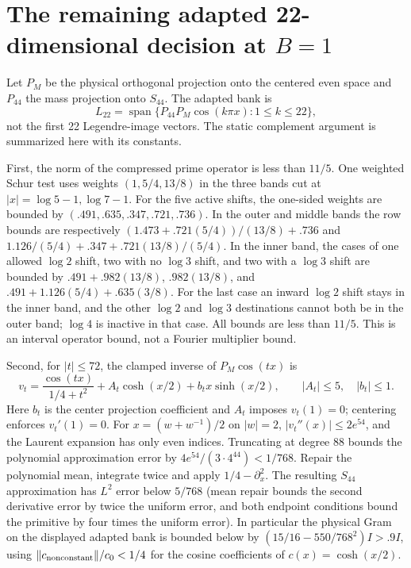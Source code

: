 \documentclass[11pt,a4paper]{article}
\numberwithin{equation}{section}
\theoremstyle{definition}\newtheorem{definition}[theorem]{Definition}
\theoremstyle{remark}\newtheorem{remark}[theorem]{Remark}
\begin{document}
\section[Adapted 22-dimensional decision at B=1]{The remaining adapted 22-dimensional decision at $B=1$}
Let $P_M$ be the physical orthogonal projection onto the centered even space and $P_{44}$ the mass projection onto $S_{44}$. The adapted bank is
\[
 L_{22}=\operatorname{span}\{P_{44}P_M\cos(k\pi x):1\le k\le22\},
\]
not the first 22 Legendre-image vectors. The static complement argument is summarized here with its constants.

First, the norm of the compressed prime operator is less than $11/5$. One weighted Schur test uses weights $(1,5/4,13/8)$ in the three bands cut at $|x|=\log5-1,\log7-1$. For the five active shifts, the one-sided weights are bounded by $(.491,.635,.347,.721,.736)$. In the outer and middle bands the row bounds are respectively $(1.473+.721(5/4))/(13/8)+.736$ and $1.126/(5/4)+.347+.721(13/8)/(5/4)$. In the inner band, the cases of one allowed $\log 2$ shift, two with no $\log3$ shift, and two with a $\log3$ shift are bounded by $.491+.982(13/8)$, $.982(13/8)$, and $.491+1.126(5/4)+.635(3/8)$. For the last case an inward $\log2$ shift stays in the inner band, and the other $\log2$ and $\log3$ destinations cannot both be in the outer band; $\log4$ is inactive in that case. All bounds are less than $11/5$. This is an interval operator bound, not a Fourier multiplier bound.

Second, for $|t|\le72$, the clamped inverse of $P_M\cos(tx)$ is
\[
 v_t=\frac{\cos(tx)}{1/4+t^2}+A_t\cosh(x/2)+b_t x\sinh(x/2),
 \qquad |A_t|\le5,\quad |b_t|\le1.
\]
Here $b_t$ is the center projection coefficient and $A_t$ imposes $v_t(1)=0$; centering enforces $v_t'(1)=0$. For $x=(w+w^{-1})/2$ on $|w|=2$, $|v_t''(x)|\le2e^{54}$, and the Laurent expansion has only even indices. Truncating at degree 88 bounds the polynomial approximation error by $4e^{54}/(3\cdot4^{44})<1/768$. Repair the polynomial mean, integrate twice and apply $1/4-\partial_x^2$. The resulting $S_{44}$ approximation has $L^2$ error below $5/768$ (mean repair bounds the second derivative error by twice the uniform error, and both endpoint conditions bound the primitive by four times the uniform error). In particular the physical Gram on the displayed adapted bank is bounded below by $(15/16-550/768^2)I>.9I$, using $\|c_{\rm nonconstant}\|/c_0<1/4$ for the cosine coefficients of $c(x)=\cosh(x/2)$.
\end{document}
